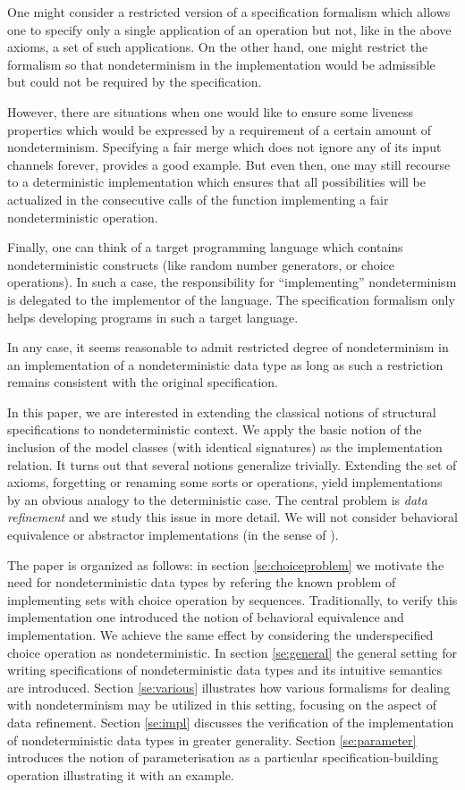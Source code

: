 One might consider a restricted version of a specification formalism which allows
one to specify only a single application of an operation but not, like in the above axioms, a set of such applications. On the other hand, one might restrict the formalism so that nondeterminism in the implementation would be admissible but could not be required by the specification.

However, there are situations when one would like to ensure some liveness properties which would be expressed by a requirement of a certain amount of
nondeterminism. Specifying a fair merge which does not ignore any of its input channels forever, provides a good example. But even then,
one may still recourse to a deterministic implementation which ensures that all possibilities will be actualized in the consecutive calls of the function implementing a fair nondeterministic operation.

Finally, one can think of a target programming language which contains nondeterministic constructs (like random number generators, or choice operations). In such a case, the responsibility for ``implementing'' nondeterminism is delegated to the implementor of the language. The specification formalism only helps developing programs in such a target language.

In any case, it seems reasonable to admit restricted degree of nondeterminism in an implementation of a nondeterministic data type as long as such a restriction remains consistent with the original specification. 

In this paper, we are interested in extending the classical notions of structural specifications to nondeterministic context. We apply the basic notion of the inclusion of the model classes (with identical signatures)
as the implementation relation.
It turns out that several notions
generalize trivially. Extending the set of axioms, forgetting or renaming some sorts or operations, yield implementations by an obvious analogy
to the deterministic case. The central problem is {\em data refinement} and we study this issue in more detail. We will not consider behavioral equivalence or abstractor implementations (in the sense of \cite{ST}). 

The paper is organized as follows: in section \ref{se:choiceproblem} we motivate the need for nondeterministic data types by refering the known problem of implementing sets with choice operation by sequences. Traditionally, to verify this implementation one introduced the notion of behavioral equivalence and implementation. We achieve the same effect by considering the underspecified choice operation as nondeterministic. In section
\ref{se:general} the general setting for writing specifications of nondeterministic data types and its intuitive semantics are introduced. Section \ref{se:various} illustrates how various formalisms for dealing with nondeterminism may be utilized in this setting, focusing on the aspect of data refinement. Section \ref{se:impl} discusses the verification of the implementation
of nondeterministic data types in greater generality. Section \ref{se:parameter} introduces the notion of parameterisation as a particular specification-building operation illustrating it with an example. 

